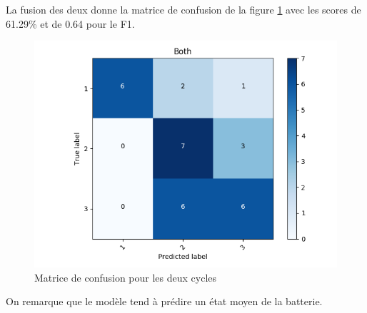 La fusion des deux donne la matrice de confusion de la figure \ref{fig:HMMconfboth} avec les scores de 61.29\% et de 0.64 pour le F1.

\begin{figure}
    \centering
    \includegraphics[scale=0.5]{images/Confboth.png}
    \caption{Matrice de confusion pour les deux cycles}
    \label{fig:HMMconfboth}
\end{figure}

On remarque que le modèle tend à prédire un état moyen de la batterie.